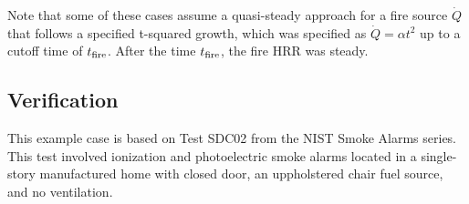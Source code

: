 Note that some of these cases assume a quasi-steady approach for a fire source $\dot Q$ that follows a specified t-squared growth, which was specified as $\dot Q = \alpha t^2$ up to a cutoff time of $t\sb{fire}$. After the time $t\sb{fire}$, the fire HRR was steady.


\clearpage


\subsection*{Verification}

This example case is based on Test SDC02 from the NIST Smoke Alarms series. This test involved ionization and photoelectric smoke alarms located in a single-story manufactured home with closed door, an uppholstered chair fuel source, and no ventilation.

